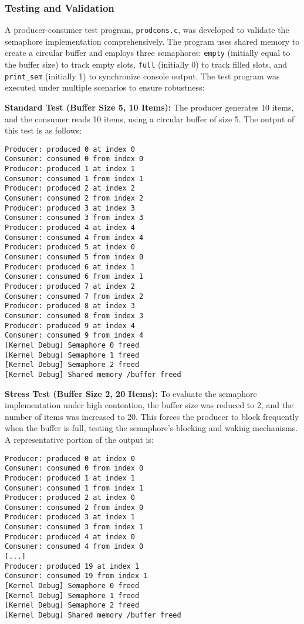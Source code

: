 \documentclass[12pt]{article}
\begin{document}
\subsubsection{Testing and Validation}
\label{subsubsec:semaphore-testing}

A producer-consumer test program, \texttt{prodcons.c}, was developed to validate the semaphore implementation comprehensively. The program uses shared memory to create a circular buffer and employs three semaphores: \texttt{empty} (initially equal to the buffer size) to track empty slots, \texttt{full} (initially 0) to track filled slots, and \texttt{print\_sem} (initially 1) to synchronize console output. The test program was executed under multiple scenarios to ensure robustness:

\textbf{Standard Test (Buffer Size 5, 10 Items):} The producer generates 10 items, and the consumer reads 10 items, using a circular buffer of size 5. The output of this test is as follows:
\begin{lstlisting}
Producer: produced 0 at index 0
Consumer: consumed 0 from index 0
Producer: produced 1 at index 1
Consumer: consumed 1 from index 1
Producer: produced 2 at index 2
Consumer: consumed 2 from index 2
Producer: produced 3 at index 3
Consumer: consumed 3 from index 3
Producer: produced 4 at index 4
Consumer: consumed 4 from index 4
Producer: produced 5 at index 0
Consumer: consumed 5 from index 0
Producer: produced 6 at index 1
Consumer: consumed 6 from index 1
Producer: produced 7 at index 2
Consumer: consumed 7 from index 2
Producer: produced 8 at index 3
Consumer: consumed 8 from index 3
Producer: produced 9 at index 4
Consumer: consumed 9 from index 4
[Kernel Debug] Semaphore 0 freed
[Kernel Debug] Semaphore 1 freed
[Kernel Debug] Semaphore 2 freed
[Kernel Debug] Shared memory /buffer freed
\end{lstlisting}

\textbf{Stress Test (Buffer Size 2, 20 Items):} To evaluate the semaphore implementation under high contention, the buffer size was reduced to 2, and the number of items was increased to 20. This forces the producer to block frequently when the buffer is full, testing the semaphore’s blocking and waking mechanisms. A representative portion of the output is:
\begin{lstlisting}
Producer: produced 0 at index 0
Consumer: consumed 0 from index 0
Producer: produced 1 at index 1
Consumer: consumed 1 from index 1
Producer: produced 2 at index 0
Consumer: consumed 2 from index 0
Producer: produced 3 at index 1
Consumer: consumed 3 from index 1
Producer: produced 4 at index 0
Consumer: consumed 4 from index 0
[...]
Producer: produced 19 at index 1
Consumer: consumed 19 from index 1
[Kernel Debug] Semaphore 0 freed
[Kernel Debug] Semaphore 1 freed
[Kernel Debug] Semaphore 2 freed
[Kernel Debug] Shared memory /buffer freed
\end{lstlisting}
\end{document}
